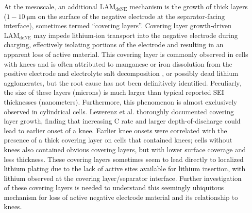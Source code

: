 \documentclass[journal=jpclcd,manuscript=article]{achemso}
\begin{document}
At the mesoscale, an additional $\mathrm{LAM_{deNE}}$ mechanism is the growth of thick layers ($1-10\: \mathrm{\mu m}$ on the surface of the negative electrode at the separator-facing interface), sometimes termed ``covering layers''\cite{lewerenz_post-mortem_2017, lewerenz_systematic_2017, willenberg_development_2020}.
Covering layer growth-driven $\mathrm{LAM_{deNE}}$ may impede lithium-ion transport into the negative electrode during charging, effectively isolating portions of the electrode and resulting in an apparent loss of active material. This covering layer is commonly observed in cells with knees and is often attributed to manganese or iron dissolution from the positive electrode and electrolyte salt decomposition \cite{lewerenz_post-mortem_2017,lewerenz_systematic_2017,zhu_investigation_2021,stiaszny_electrochemical_2014,rahe_nanoscale_2019,keil_linear_2019,sarasketa-zabala_understanding_2015, li_degradation_2016, klett_non-uniform_2014, klett_uneven_2015, willenberg_high-precision_2020, wang_cycle-life_2011}, or possibly dead lithium agglomerates\cite{schindler_fast_2018}, but the root cause has not been definitively identified. Peculiarly, the size of these layers (microns) is much larger than typical reported SEI thicknesses (nanometers)\cite{peled_reviewsei_2017}. Furthermore, this phenomenon is almost exclusively observed in cylindrical cells.
Lewerenz et al.\cite{lewerenz_post-mortem_2017,lewerenz_systematic_2017} thoroughly documented covering layer growth, finding that increasing C rate and larger depth-of-discharge could lead to earlier onset of a knee. Earlier knee onsets were correlated with the presence of a thick covering layer on cells that contained knees; cells without knees also contained obvious covering layers, but with lower surface coverage and less thickness. These covering layers sometimes seem to lead directly to localized lithium plating due to the lack of active sites available for lithium insertion, with lithium observed at the covering layer/separator interface.\cite{zhu_investigation_2021}
Further investigation of these covering layers is needed to understand this seemingly ubiquitous mechanism for loss of active negative electrode material and its relationship to knees.
\end{document}
